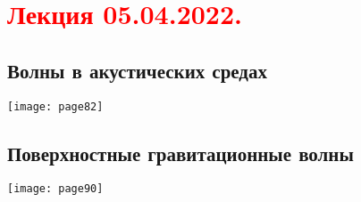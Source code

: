 \documentclass[main.tex]{subfiles}
\begin{document}
\section{\textcolor{red}{Лекция 05.04.2022.}}

\subsection{Волны в акустических средах}
\texttt{[image: page82]}








\subsection{Поверхностные гравитационные волны}
\texttt{[image: page90]}


\end{document}
